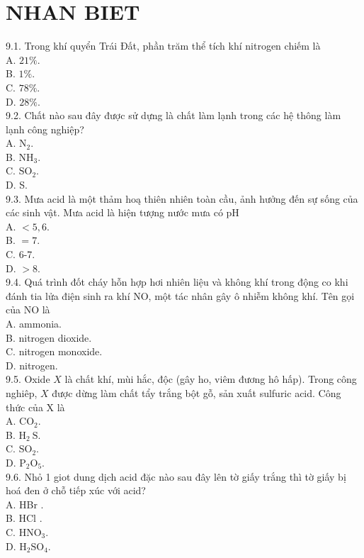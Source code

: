 \documentclass[10pt]{article}
\begin{document}
\section*{NHAN BIET}
9.1. Trong khí quyển Trái Đất, phần trăm thể tích khí nitrogen chiếm là\\
A. $21 \%$.\\
B. $1 \%$.\\
C. $78 \%$.\\
D. $28 \%$.\\
9.2. Chất nào sau đây được sử dựng là chất làm lạnh trong các hệ thông làm lạnh công nghiệp?\\
A. $\mathrm{N}_{2}$.\\
B. $\mathrm{NH}_{3}$.\\
C. $\mathrm{SO}_{2}$.\\
D. S.\\
9.3. Mưa acid là một thảm hoą thiên nhiên toàn cầu, ảnh hưởng đến sự sống của các sinh vật. Mưa acid là hiện tượng nước mưa có pH\\
A. $<5,6$.\\
B. $=7$.\\
C. 6-7.\\
D. $>8$.\\
9.4. Quá trình đốt cháy hỗn hợp hơi nhiên liệu và không khí trong động co khi đánh tia lửa điện sinh ra khí NO, một tác nhân gây ô nhiễm không khí. Tên gọi của NO là\\
A. ammonia.\\
B. nitrogen dioxide.\\
C. nitrogen monoxide.\\
D. nitrogen.\\
9.5. Oxide $X$ là chất khí, mùi hắc, độc (gây ho, viêm đương hô hấp). Trong công nghiêp, $X$ được dừng làm chất tẩy trắng bột gỗ, sản xuất sulfuric acid. Công thức của X là\\
A. $\mathrm{CO}_{2}$.\\
B. $\mathrm{H}_{2} \mathrm{~S}$.\\
C. $\mathrm{SO}_{2}$.\\
D. $\mathrm{P}_{2} \mathrm{O}_{5}$.\\
9.6. Nhỏ 1 giot dung dịch acid đặc nào sau đây lên tờ giấy trắng thì tờ giấy bị hoá đen ở chỗ tiếp xúc với acid?\\
A. HBr .\\
B. HCl .\\
C. $\mathrm{HNO}_{3}$.\\
D. $\mathrm{H}_{2} \mathrm{SO}_{4}$.\\
\end{document}
